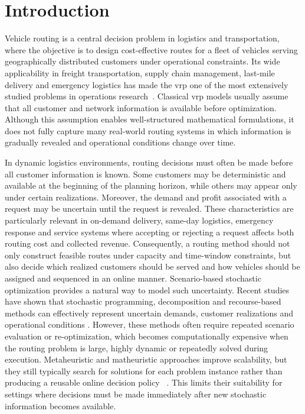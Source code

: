 \documentclass[pdflatex]{sn-jnl}
\begin{document}
\section{Introduction}

Vehicle routing is a central decision problem in logistics and transportation, where the objective is to design cost-effective routes for a fleet of vehicles serving geographically distributed customers under operational constraints. Its wide applicability in freight transportation, supply chain management, last-mile delivery and emergency logistics has made the \gls{vrp} one of the most extensively studied problems in operations research~\cite{toth2002vehicle}.
Classical \gls{vrp} models usually assume that all customer and network
information is available before optimization. Although this assumption enables well-structured mathematical formulations, it does not fully capture many real-world routing systems in which information is gradually revealed and operational conditions change over time.

In dynamic logistics environments, routing decisions must often be made before all customer information is known. Some customers may be deterministic and available at the beginning of the planning horizon, while others may appear only under certain realizations. Moreover, the demand and profit associated with a request may be uncertain until the request is revealed. These characteristics are particularly relevant in on-demand delivery, same-day logistics, emergency response and service systems where accepting or rejecting a request affects
both routing cost and collected revenue. Consequently, a routing method should not only construct feasible routes under capacity and time-window constraints, but also decide which realized customers should be served and how vehicles should be assigned and sequenced in an online manner. Scenario-based stochastic optimization provides a natural way to model such uncertainty. Recent studies have shown that stochastic programming, decomposition and recourse-based methods can effectively represent uncertain demands, customer realizations and operational conditions \cite{delavega2023integer,alvarez2024consistent,reusken2024vehicle}. However, these methods often require repeated scenario evaluation or re-optimization, which becomes computationally expensive when the routing problem is large, highly dynamic or repeatedly solved during execution. Metaheuristic and matheuristic approaches improve scalability, but they still typically search for solutions for each problem instance rather than producing a reusable online
decision policy ~\cite{ozarik2023adaptive,wang2025truck,tureci2025stochastic}.
This limits their suitability for settings where decisions must be made
immediately after new stochastic information becomes available.
\end{document}
